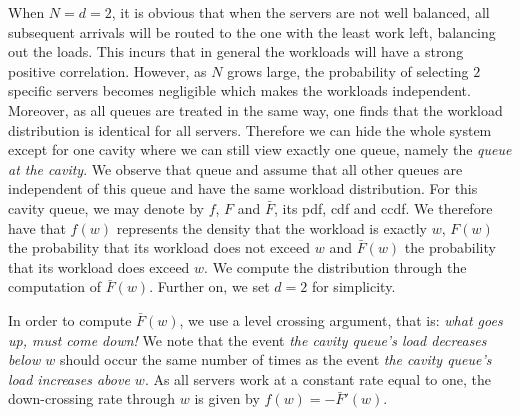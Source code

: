 \documentclass[12pt]{report}
\begin{document}
When $N=d=2$, it is obvious that when the servers are not well balanced, all subsequent arrivals will be routed to the one with the least work left, balancing out the loads. This incurs that in general the workloads will have a strong positive correlation. However, as $N$ grows large, the probability of selecting $2$ specific servers becomes negligible which makes the workloads independent. Moreover, as all queues are treated in the same way, one finds that the workload distribution is identical for all servers. Therefore we can hide the whole system except for one cavity where we can still view exactly one queue, namely the \textit{queue at the cavity}. We observe that queue and assume that all other queues are independent of this queue and have the same workload distribution. For this cavity queue, we may denote by $f$, $F$ and $\bar F$, its pdf, cdf and ccdf. We therefore have that $f(w)$ represents the density that the workload is exactly $w$, $F(w)$ the probability that its workload does not exceed $w$ and $\bar F(w)$ the probability that its workload does exceed $w$. We compute the distribution through the computation of $\bar F(w)$. Further on, we set $d=2$ for simplicity.

In order to compute $\bar F(w)$, we use a level crossing argument, that is: \textit{what goes up, must come down!} We note that the event \textit{the cavity queue's load decreases below $w$} should occur the same number of times as the event \textit{the cavity queue's load increases above $w$}. As all servers work at a constant rate equal to one, the down-crossing rate through $w$ is given by $f(w) = -\bar F'(w)$.
\end{document}
